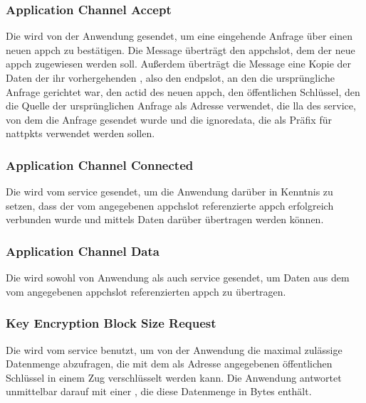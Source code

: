 \asprotoappchinreqbytefield


\subsubsection{Application Channel Accept}
\label{dcl-asproto-appchaccept}
Die \msg{\asprotoappchaccept} wird von der Anwendung gesendet, um eine eingehende
Anfrage über einen neuen \gls{appch} zu bestätigen.
Die Message überträgt den \gls{appchslot}, dem der neue \gls{appch} zugewiesen
werden soll. Außerdem überträgt die Message eine Kopie der Daten der ihr
vorhergehenden \msg{\asprotoappchinreq}, also den \gls{endpslot}, an den die
ursprüngliche Anfrage gerichtet war, den \gls{actid} des neuen \gls{appch},
den öffentlichen Schlüssel, den die Quelle der ursprünglichen Anfrage als
Adresse verwendet, die \gls{lla} des \gls{service}, von dem die Anfrage gesendet
wurde und die \gls{ignoredata}, die als Präfix für \glspl{nattpkt} verwendet
werden sollen.

\asprotoappchacceptbytefield


\subsubsection{Application Channel Connected}
\label{dcl-asproto-appchconnected}
Die \msg{\asprotoappchconnected} wird vom \gls{service} gesendet, um die
Anwendung darüber in Kenntnis zu setzen, dass der vom angegebenen
\gls{appchslot} referenzierte \gls{appch} erfolgreich verbunden wurde und
mittels \msg{\asprotoappchdata} Daten darüber übertragen werden können.

\asprotoappchconnectedbytefield


\subsubsection{Application Channel Data}
\label{dcl-asproto-appchdata}
Die \msg{\asprotoappchdata} wird sowohl von Anwendung als auch \gls{service}
gesendet, um Daten aus dem vom angegebenen \gls{appchslot} referenzierten
\gls{appch} zu übertragen.

\asprotoappchdatabytefield


\subsubsection{Key Encryption Block Size Request}
\label{dcl-asproto-keyencblocksizereq}
Die \msg{\asprotokeyencblocksizereq} wird vom \gls{service} benutzt, um von der
Anwendung die maximal zulässige Datenmenge abzufragen, die mit dem als Adresse
angegebenen öffentlichen Schlüssel in einem Zug verschlüsselt werden kann.
Die Anwendung antwortet unmittelbar darauf mit einer \msg{\asprotokeynum}, die
diese Datenmenge in Bytes enthält.

